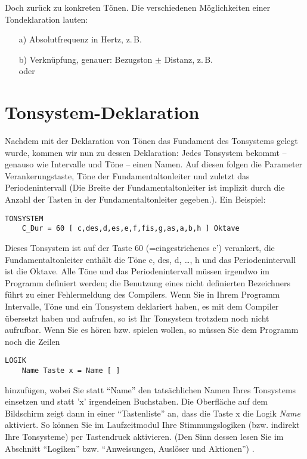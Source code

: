 Doch zurück zu konkreten Tönen. Die verschiedenen Möglichkeiten einer
Tondeklaration lauten:
\begin{itemize}
\item[a)] Absolutfrequenz in Hertz, z.\,B. 
\item[b)] Verknüpfung, genauer: Bezugston $\pm$  Distanz, z.\,B.\\
 oder\\
\end{itemize}

\section{Tonsystem-Deklaration}\label{sec:tonsyst-dekl}
Nachdem mit der Deklaration von Tönen das Fundament des
Tonsystems gelegt wurde, kommen wir nun zu dessen Deklaration:
Jedes Tonsystem bekommt -- genauso wie Intervalle und 
Töne -- einen Namen. Auf diesen folgen
die Parameter Verankerungstaste, Töne der Fundamentaltonleiter und zuletzt das
Periodenintervall (Die Breite der Fundamentaltonleiter ist implizit durch die Anzahl
der Tasten in der Fundamentaltonleiter gegeben.). Ein Beispiel:
\begin{verbatim}
TONSYSTEM
    C_Dur = 60 [ c,des,d,es,e,f,fis,g,as,a,b,h ] Oktave
\end{verbatim}
Dieses Tonsystem ist auf der Taste 60 (=eingestrichenes c')
verankert, die Fundamentaltonleiter enthält die Töne c, des, d, \dots, h und das
Periodenintervall ist die Oktave. Alle Töne und das Periodenintervall
müssen irgendwo im Programm definiert werden; die Benutzung eines
nicht definierten Bezeichners führt zu einer Fehlermeldung des
Compilers.
Wenn Sie in Ihrem Programm Intervalle, Töne und ein Tonsystem
deklariert haben, es mit dem Compiler übersetzt haben und
aufrufen, so ist Ihr Tonsystem trotzdem noch nicht aufrufbar. Wenn Sie
es hören bzw. spielen wollen, so müssen Sie dem Programm
noch die Zeilen
\begin{verbatim}
LOGIK
    Name Taste x = Name [ ]
\end{verbatim}
hinzufügen, wobei Sie statt "`Name"' den tatsächlichen Namen Ihres
Tonsystems einsetzen und statt 'x' irgendeinen Buchstaben. Die
Oberfläche auf dem Bildschirm zeigt dann in einer "`Tastenliste"' an, dass die Taste x
die Logik \emph{Name} aktiviert. So können Sie im Laufzeitmodul Ihre
Stimmungslogiken (bzw. indirekt Ihre Tonsysteme) per Tastendruck
aktivieren. (Den Sinn dessen lesen Sie im Abschnitt
"`Logiken"' bzw. "`Anweisungen, Auslöser und Aktionen"') .

